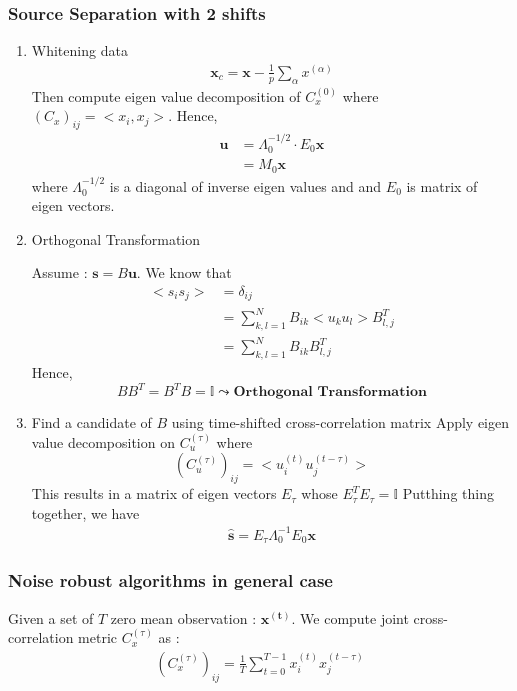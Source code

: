 \subsubsection{Source Separation with 2 shifts}
\begin{enumerate}
	\item  Whitening data 
	\begin{align*}
		\boldsymbol{x}_c = \boldsymbol{x} - \frac{1}{p} \sum_{\alpha} x^{(\alpha)}
	\end{align*}
	Then compute eigen value decomposition of $C_x^{(0)}$ where $(C_x)_{ij} = <x_i, x_j>$. Hence,
	\begin{align*}
		\boldsymbol{u} &= \Lambda_0^{-1/2}  \cdot E_0 \boldsymbol{x} \\
		&= M_0 \boldsymbol{x}
	\end{align*}
	where $\Lambda_0^{-1/2}$ is a diagonal of inverse eigen values and and $E_0$ is matrix of eigen vectors.
	\item Orthogonal Transformation

	Assume : $\boldsymbol{s} = B\boldsymbol{u}$. We know that 
	\begin{align*}
		<s_is_j> &= \delta_{ij} \\
		&= \sum_{k,l=1}^{N}B_{ik}<u_ku_l>B_{l,j}^{T} \\
		&= \sum_{k,l=1}^{N}B_{ik} B_{l,j}^{T} \tag*{($<u_ku_l> = 1 $ from Whitening)} 
	\end{align*} 
	Hence, $$BB^T  = B^TB = \mathbb{I} \leadsto \textbf{Orthogonal Transformation}$$
	
	\item Find a candidate of $B$ using time-shifted cross-correlation matrix
	Apply eigen value decomposition  on $C_u^{(\tau)}$ where 
	$$(C_u^{(\tau)})_{ij} = <u_i^{(t)} u_j^{(t-\tau)} >$$
	This results in a matrix of eigen vectors $E_{\tau}$ whose $E_{\tau}^TE_\tau = \mathbb{I}$ 
	Putthing thing together, we have 
	\begin{align*}
		\boldsymbol{\hat{s}} = E_\tau \Lambda_0^{-1}  E_0 \boldsymbol{x}
	\end{align*}
\end{enumerate}

\subsubsection{Noise robust algorithms in general case}
Given a set of $T$ zero mean observation : $\boldsymbol{x^{(t)}}$. We compute joint cross-correlation metric $C_x^{(\tau)}$ as :
\begin{align*}
(C_x^{(\tau)})_{ij} = \frac{1}{T}	\sum_{t=0}^{T-1}  x_i^{(t)} x_j^{(t-\tau)}
\end{align*}

